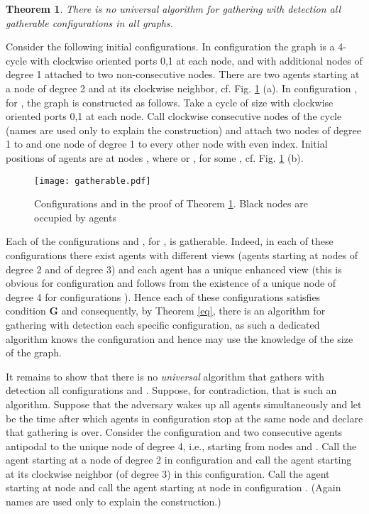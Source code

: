 \documentclass[11pt]{article}
\newtheorem{theorem}{Theorem}[section]
\newcommand{\qed}{\hfill  \bigbreak}
\newenvironment{proof}{\noindent {\bf Proof.}}{\qed}
\begin{document}
\begin{theorem}\label{no}
There is no universal algorithm for gathering with detection all gatherable configurations in all graphs. 
\end{theorem}

\begin{proof}
Consider the following initial configurations. In configuration  the graph is a 4-cycle with clockwise oriented ports 0,1 at each node, and with additional
nodes of degree 1 attached to two non-consecutive nodes. There are two agents starting at a node of degree 2 and at its clockwise neighbor, cf. Fig. 
 \ref{fig:gatherable} (a).
In configuration , for , the graph is constructed as follows. Take a cycle of size   with clockwise oriented ports 0,1 at each node. 
Call clockwise consecutive nodes of the cycle  (names are used only to explain the construction) 
and attach two nodes of degree 1 to  and one node of degree 1 to every other node with even index. Initial positions of agents are at nodes , where 
 or , for some ,  cf. Fig. \ref{fig:gatherable} (b).

\begin{figure}[h!]
        \begin{center}
        \texttt{[image: gatherable.pdf]}
        \caption{Configurations  and  in the proof of
Theorem \ref{no}. Black nodes are occupied by agents}
        \label{fig:gatherable}
        \end{center}
\end{figure}

Each of the configurations  and , for , is gatherable. Indeed, in each of these configurations there exist agents with different views
(agents starting at nodes of degree 2 and of degree 3) and each agent has a unique enhanced view (this is obvious for configuration  and follows 
from the existence of a unique node of degree 4 for configurations ). Hence each of these configurations satisfies condition {\bf G} and consequently,
by Theorem \ref{eq}, there is an algorithm for gathering with detection each specific configuration, as such a dedicated algorithm knows 
the configuration and hence may use the knowledge of the size
of the graph.

It remains to show that there is no {\em universal} algorithm that gathers with detection all configurations  and . Suppose, for contradiction, that  is such 
an algorithm. Suppose that the adversary wakes up all agents simultaneously and let  be the time after which agents in configuration  stop at the same node
and declare that gathering is over. Consider the configuration  and two consecutive agents antipodal to the unique node of degree 4, i.e.,   starting from nodes
 and . Call  the agent starting at a node of degree 2 in configuration  and call  the agent starting at its clockwise neighbor (of degree 3)
in this configuration. Call  the agent starting at node  and call  the agent starting at node  in configuration .
(Again names are used only to explain the construction.) 


\end{proof}
\end{document}
